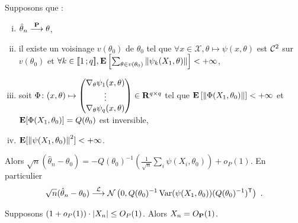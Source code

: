 	\begin{thm}
		Supposons que :
		\begin{enumerate}[(i)]
			\item $\hat{\theta}_n \overset{\mathbf{P}}{\longrightarrow} \theta$,
			\item il existe un voisinage $v(\theta_0)$ de $\theta_0$ tel que $\forall x \in \mathcal{X}, \theta \mapsto \psi(x,\theta)$ est $\mathcal{C}^2$ sur $v(\theta_0)$ et $\forall k \in \mathopen{}\mathclose{\left[\![1\mathclose{}\mathpunct{};q\right]\!]}, \mathbf{E} \left[ \sum_{\theta \in v(\theta_0)} \left\lVert\psi_k(X_1,\theta)\right\rVert \right] < +\infty$,
			\item soit $\Phi \colon (x,\theta) \mapsto \begin{pmatrix} \nabla_\theta \psi_1(x,\theta) \\ \vdots \\ \nabla_\theta \psi_q(x,\theta) \end{pmatrix} \in \mathbf{R}^{q \times q}$ tel que $\mathbf{E} \left[ \left\lVert\Phi(X_1,\theta_0)\right\rVert \right] < +\infty$ et $\mathbf{E}[ \Phi(X_1,\theta_0) ] = Q(\theta_0)$ est inversible,
			\item $\mathbf{E}[ \left\lVert\psi(X_1,\theta_0)\right\rVert^2 ] < +\infty$.
		\end{enumerate}
		Alors $\sqrt{n}(\hat{\theta}_n - \theta_0) = -Q(\theta_0)^{-1} \left( \frac{1}{\sqrt{n}} \sum_i \psi(X_i,\theta_0) \right) + o_P(1)$.
		En particulier
		$$\sqrt{n}(\hat{\theta}_n - \theta_0) \overset{\mathcal{L}}{\longrightarrow} \mathcal{N} \left( 0, Q(\theta_0)^{-1} \operatorname{Var}(\psi(X_1,\theta_0)) (Q(\theta_0)^{-1})^\mathsf{T} \right)\ .$$
	\end{thm}

	\begin{lem}
		Supposons $(1 + o_P(1)) \cdot \left\lvert X_n\right\rvert \leq O_P(1)$.
		Alors $X_n = O_{\mathbf{P}}(1)$.
	\end{lem}
